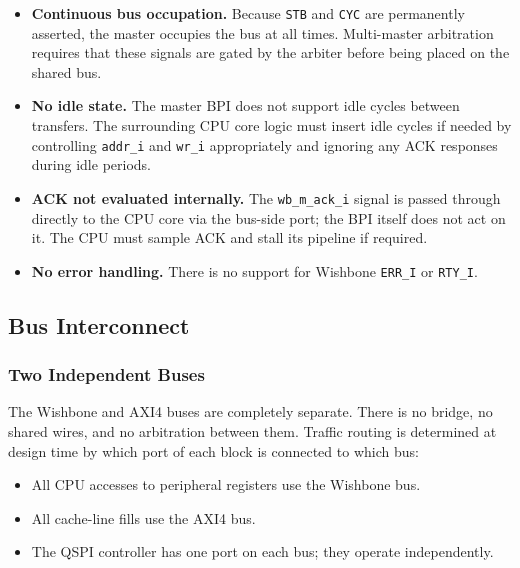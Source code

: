 \begin{itemize}
  \item \textbf{Continuous bus occupation.}
    Because \texttt{STB} and \texttt{CYC} are permanently asserted,
    the master occupies the bus at all times.
    Multi-master arbitration requires that these signals are gated
    by the arbiter before being placed on the shared bus.
  \item \textbf{No idle state.}
    The master BPI does not support idle cycles between transfers.
    The surrounding CPU core logic must insert idle cycles if needed
    by controlling \texttt{addr\_i} and \texttt{wr\_i} appropriately and
    ignoring any ACK responses during idle periods.
  \item \textbf{ACK not evaluated internally.}
    The \texttt{wb\_m\_ack\_i} signal is passed through directly to the
    CPU core via the bus-side port; the BPI itself does not act on it.
    The CPU must sample ACK and stall its pipeline if required.
  \item \textbf{No error handling.}
    There is no support for Wishbone \texttt{ERR\_I} or \texttt{RTY\_I}.
\end{itemize}


\subsection{Bus Interconnect}
\label{subsec:asBusInterconnect}

\subsubsection{Two Independent Buses}

The Wishbone and AXI4 buses are completely separate.
There is no bridge, no shared wires, and no arbitration between them.
Traffic routing is determined at design time by which port of each block
is connected to which bus:

\begin{itemize}
  \item All CPU accesses to peripheral registers use the Wishbone bus.
  \item All cache-line fills use the AXI4 bus.
  \item The QSPI controller has one port on each bus; they operate
    independently.
\end{itemize}

